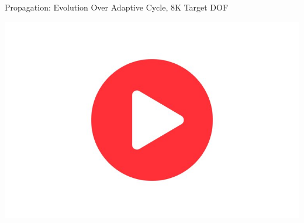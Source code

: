 \documentclass{beamer}
\newcounter{sectionframecount}
\begin{document}

\begin{frame}[t]{Propagation: Evolution Over Adaptive Cycle, 8K Target DOF}

  \centering
  \href{run:burgers_mesh_and_primal_combined_8K.mp4}{\includegraphics[width=0.6\linewidth]{../figs/SBW3results/playVideoSymbol.jpg}}

\end{frame}

\end{document}
